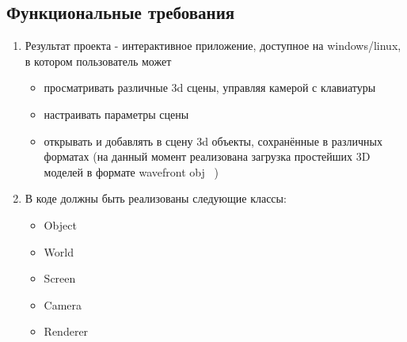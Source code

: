 \documentclass{article}
\begin{document}
\subsection{Функциональные требования}
\begin{enumerate}
\item Результат проекта - интерактивное приложение, доступное на windows/linux, в котором пользователь может
\begin{itemize}
	\item просматривать различные 3d сцены, управляя камерой с клавиатуры
	\item настраивать параметры сцены
	\item открывать и добавлять в сцену 3d объекты, сохранённые в различных форматах (на данный момент реализована загрузка простейших 3D моделей в формате wavefront obj ~\cite{obj})
\end{itemize}
	\item В коде должны быть реализованы следующие классы:
	\begin{itemize}
		\item Object
		\item World
		\item Screen
		\item Camera
		\item Renderer
	\end{itemize}
\end{enumerate}
\end{document}
